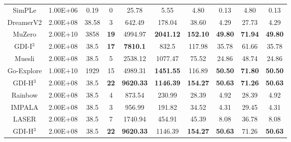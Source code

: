 \documentclass[nohyperref]{article}
\def\GDIHmeanhns{9620.33}
\def\GDIHmedianhns{1146.39}
\def\GDIHHWRB{22}
\def\GDIHmeanHWRNS{154.27}
\def\GDIHmedianHWRNS{50.63}
\def\GDIHmeanSABER{71.26}
\def\GDIHmedianSABER{50.63}
\def\GDIHnumframes{2.00E+08}
\def\GDIHgametime{38.5}
\def\GDIImeanhns{7810.1}
\def\GDIImedianhns{832.5}
\def\GDIIHWRB{17}
\def\GDIImeanHWRNS{117.98}
\def\GDIImedianHWRNS{35.78}
\def\GDIImeanSABER{61.66}
\def\GDIImedianSABER{35.78}
\def\GDIInumframes{2.00E+08}
\def\GDIIgametime{38.5}
\def\rainbowmeanhns{873.54}
\def\rainbowmedianhns{230.99}
\def\rainbowHWRB{4}
\def\rainbowmeanHWRNS{28.39}
\def\rainbowmedianHWRNS{4.92}
\def\rainbowmeanSABER{28.39}
\def\rainbowmedianSABER{4.92}
\def\rainbownumframes{2.00E+08}
\def\rainbowgametime{38.5}
\def\impalameanhns{956.99}
\def\impalamedianhns{191.82}
\def\impalaHWRB{3}
\def\impalameanHWRNS{34.52}
\def\impalamedianHWRNS{4.31}
\def\impalameanSABER{29.45}
\def\impalamedianSABER{4.31}
\def\impalanumframes{2.00E+08}
\def\impalagametime{38.5}
\def\lasermeanhns{1740.94}
\def\lasermedianhns{454.91}
\def\laserHWRB{7}
\def\lasermeanHWRNS{45.39}
\def\lasermedianHWRNS{8.08}
\def\lasermeanSABER{36.78}
\def\lasermedianSABER{8.08}
\def\lasernumframes{2.00E+08}
\def\lasergametime{38.5}
\def\muzeromeanhns{4994.97}
\def\muzeromedianhns{2041.12}
\def\muzeroHWRB{19}
\def\muzeromeanHWRNS{152.10}
\def\muzeromedianHWRNS{49.80}
\def\muzeromeanSABER{71.94}
\def\muzeromedianSABER{49.80}
\def\muzeronumframes{2.00E+10}
\def\muzerogametime{3858}
\def\dreamermeanhns{642.49}
\def\dreamermedianhns{178.04}
\def\dreamerHWRB{3}
\def\dreamermeanHWRNS{38.60}
\def\dreamermedianHWRNS{4.29}
\def\dreamermeanSABER{27.73}
\def\dreamermedianSABER{4.29}
\def\dreamernumframes{2.00E+08}
\def\dreamergametime{38.58 }
\def\simplemeanhns{25.78}
\def\simplemedianhns{5.55}
\def\simpleHWRB{0}
\def\simplemeanHWRNS{4.80}
\def\simplemedianHWRNS{0.13}
\def\simplemeanSABER{4.80}
\def\simplemedianSABER{0.13}
\def\simplenumframes{1.00E+06}
\def\simplegametime{0.19}
\def\mueslimeanhns{2538.12}
\def\mueslimedianhns{1077.47}
\def\muesliHWRB{5}
\def\mueslimeanHWRNS{75.52}
\def\mueslimedianHWRNS{24.86}
\def\mueslimeanSABER{48.74}
\def\mueslimedianSABER{24.86}
\def\mueslinumframes{2.00E+08}
\def\muesligametime{38.5}
\def\goexploremeanhns{4989.31}
\def\goexploremedianhns{1451.55}
\def\goexploreHWRB{15}
\def\goexploremeanHWRNS{116.89}
\def\goexploremedianHWRNS{50.50}
\def\goexploremeanSABER{71.80}
\def\goexploremedianSABER{50.50}
\def\goexplorenumframes{1.00E+10}
\def\goexploregametime{1929}
\theoremstyle{plain}
\begin{document}
\begin{table}[H]
\begin{tabular}{ |c | c | c | c| c c | c c |c c|}
SimPLe      &\simplenumframes   & \simplegametime  & \simpleHWRB  & \simplemeanhns   & \simplemedianhns       &\simplemeanHWRNS   & \simplemedianHWRNS & \simplemeanSABER  & \simplemedianSABER\\
DreamerV2   &\dreamernumframes    & \dreamergametime     & \dreamerHWRB  & \dreamermeanhns  & \dreamermedianhns     &\dreamermeanHWRNS  & \dreamermedianHWRNS & \dreamermeanSABER & \dreamermedianSABER \\
MuZero      & \muzeronumframes   & \muzerogametime     & \textbf{\muzeroHWRB} & \muzeromeanhns & \textbf{\muzeromedianhns}    &\textbf{\muzeromeanHWRNS} & \textbf{\muzeromedianHWRNS}& \textbf{\muzeromeanSABER} & \textbf{\muzeromedianSABER} \\
\hline
\hline
GDI-I$^3$       &\GDIInumframes    &\GDIIgametime    & \textbf{\GDIIHWRB} & \textbf{\GDIImeanhns} & \GDIImedianhns     &\GDIImeanHWRNS &\GDIImedianHWRNS & \GDIImeanSABER & \GDIImedianSABER\\
Muesli      &\mueslinumframes    & \muesligametime     & \muesliHWRB           &  \mueslimeanhns         & \mueslimedianhns    & \mueslimeanHWRNS          & \mueslimedianHWRNS  & \mueslimeanSABER & \mueslimedianSABER \\
Go-Explore  & \goexplorenumframes   & \goexploregametime     & \goexploreHWRB & \goexploremeanhns & \textbf{\goexploremedianhns}    &\goexploremeanHWRNS & \textbf{\goexploremedianHWRNS}& \textbf{\goexploremeanSABER} & \textbf{\goexploremedianSABER}\\
\hline
\hline
GDI-H$^3$   &\GDIHnumframes    & \GDIHgametime    &\textbf{ \GDIHHWRB} & \textbf{\GDIHmeanhns} & \textbf{\GDIHmedianhns}     &\textbf{\GDIHmeanHWRNS} &\textbf{\GDIHmedianHWRNS} & \textbf{\GDIHmeanSABER} & \textbf{\GDIHmedianSABER}\\
Rainbow     &\rainbownumframes    & \rainbowgametime     & \rainbowHWRB  & \rainbowmeanhns  & \rainbowmedianhns     &\rainbowmeanHWRNS  & \rainbowmedianHWRNS & \rainbowmeanSABER & \rainbowmedianSABER\\
IMPALA      &\impalanumframes    & \impalagametime     & \impalaHWRB  & \impalameanhns  & \impalamedianhns     &\impalameanHWRNS  & \impalamedianHWRNS & \impalameanSABER & \impalamedianSABER\\
LASER       &\lasernumframes    & \lasergametime     & \laserHWRB  & \lasermeanhns & \lasermedianhns     &\lasermeanHWRNS  & \lasermedianHWRNS & \lasermeanSABER & \lasermedianSABER\\
\hline
\hline
GDI-H$^3$  &\GDIHnumframes    & \GDIHgametime     & \textbf{\GDIHHWRB} & \textbf{\GDIHmeanhns} & \GDIHmedianhns     &\textbf{\GDIHmeanHWRNS} &\textbf{\GDIHmedianHWRNS} & \GDIHmeanSABER &\textbf{ \GDIHmedianSABER}\\

\end{tabular}
\end{table}
\end{document}
